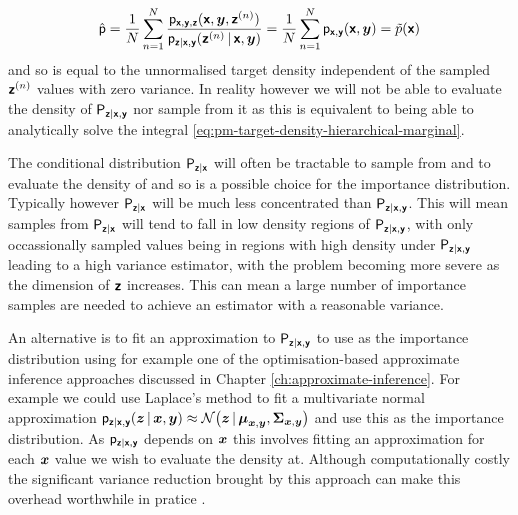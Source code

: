 \begin{equation}
  \hat{\mathsf{p}} = 
  \frac{1}{N} \sum_{n=1}^N 
  \frac
    {\mathsf{p}_{\boldsymbol{\mathsf{x}},\boldsymbol{\mathsf{y}},\boldsymbol{\mathsf{z}}}(\boldsymbol{\mathsf{x}},\boldsymbol{y},\boldsymbol{\mathsf{z}}^{(n)})}
    {\mathsf{p}_{\boldsymbol{\mathsf{z}}|\boldsymbol{\mathsf{x}},\boldsymbol{\mathsf{y}}}(\boldsymbol{\mathsf{z}}^{(n)}\operatorname{|}\boldsymbol{\mathsf{x}},\boldsymbol{y})} =
  \frac{1}{N} \sum_{n=1}^N \mathsf{p}_{\boldsymbol{\mathsf{x}},\boldsymbol{\mathsf{y}}}(\boldsymbol{\mathsf{x}},\boldsymbol{y}) = \tilde{p}(\boldsymbol{\mathsf{x}})  
\end{equation}
and so is equal to the unnormalised target density independent of the sampled $\boldsymbol{\mathsf{z}}^{(n)}$ values with zero variance. In reality however we will not be able to evaluate the density of $\mathsf{P}_{\boldsymbol{\mathsf{z}}|\boldsymbol{\mathsf{x}},\boldsymbol{\mathsf{y}}}$ nor sample from it as this is equivalent to being able to analytically solve the integral \eqref{eq:pm-target-density-hierarchical-marginal}.

The conditional distribution $\mathsf{P}_{\boldsymbol{\mathsf{z}}|\boldsymbol{\mathsf{x}}}$ will often be tractable to sample from and to evaluate the density of and so is a possible choice for the importance distribution. Typically however $\mathsf{P}_{\boldsymbol{\mathsf{z}}|\boldsymbol{\mathsf{x}}}$ will be much less concentrated than $\mathsf{P}_{\boldsymbol{\mathsf{z}}|\boldsymbol{\mathsf{x}},\boldsymbol{\mathsf{y}}}$. This will mean samples from $\mathsf{P}_{\boldsymbol{\mathsf{z}}|\boldsymbol{\mathsf{x}}}$ will tend to fall in low density regions of $\mathsf{P}_{\boldsymbol{\mathsf{z}}|\boldsymbol{\mathsf{x}},\boldsymbol{\mathsf{y}}}$, with only occassionally sampled values being in regions with high density under $\mathsf{P}_{\boldsymbol{\mathsf{z}}|\boldsymbol{\mathsf{x}},\boldsymbol{\mathsf{y}}}$ leading to a high variance estimator, with the problem becoming more severe as the dimension of $\boldsymbol{\mathsf{z}}$ increases. This can mean a large number of importance samples are needed to achieve an estimator with a reasonable variance.

An alternative is to fit an approximation to $\mathsf{P}_{\boldsymbol{\mathsf{z}}|\boldsymbol{\mathsf{x}},\boldsymbol{\mathsf{y}}}$ to use as the importance distribution using for example one of the optimisation-based approximate inference approaches discussed in Chapter \ref{ch:approximate-inference}. For example we could use Laplace's method to fit a multivariate normal approximation $\pden{\rvct{z}|\rvct{x},\rvct{y}}(\vct{z}\gvn\vct{x},\vct{y}) \approx \nrm{\vct{z} \gvn \vct{\mu}_{\vct{x},\vct{y}},\mtx{\Sigma}_{\vct{x},\vct{y}}}$ and use this as the importance distribution. As $\mathsf{p}_{\boldsymbol{\mathsf{z}}|\boldsymbol{\mathsf{x}},\boldsymbol{\mathsf{y}}}$ depends on $\boldsymbol{x}$ this involves fitting an approximation for each $\boldsymbol{x}$ value we wish to evaluate the density at. Although computationally costly the significant variance reduction brought by this approach can make this overhead worthwhile in pratice \citep{filippone2014pseudo}.

